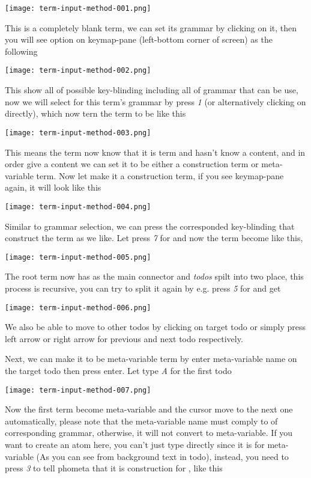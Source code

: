 \documentclass[master.tex]{subfiles}
\begin{document}
\centerline{\texttt{[image: term-input-method-001.png]}}

This is a completely blank term, we can set its grammar by clicking on it, then
you will see option on keymap-pane (left-bottom corner of screen) as the following

\centerline{\texttt{[image: term-input-method-002.png]}}

This show all of possible key-blinding including all of grammar that can be use,
now we will select  for this term's grammar by press \emph{1}
(or alternatively clicking on  directly), which now tern the
term to be like this

\centerline{\texttt{[image: term-input-method-003.png]}}

This means the term now know that it is  term and hasn't know a
content, and in order give a content we can set it to be either a construction
term or meta-variable term. Now let make it a construction term, if you see
keymap-pane again, it will look like this

\centerline{\texttt{[image: term-input-method-004.png]}}

Similar to grammar selection, we can press the corresponded key-blinding that
construct the term as we like. Let press \emph{7} for  and now the term become like this,

\centerline{\texttt{[image: term-input-method-005.png]}}

The root term now has \pifmt{$\rightarrow$} as the main connector and
\emph{todos} spilt into two place, this process is recursive, you can try to
split it again by e.g. press \emph{5} for  and get

\centerline{\texttt{[image: term-input-method-006.png]}}

We also be able to move to other todos by clicking on target todo or simply
press left arrow or right arrow for previous and next todo respectively.

Next, we can make it to be meta-variable term by enter meta-variable name on the
target todo then press enter. Let type \emph{A} for the first todo

\centerline{\texttt{[image: term-input-method-007.png]}}

Now the first term become meta-variable and the cursor move to the next one
automatically, please note that the meta-variable name must comply to \kVarRegex
of corresponding grammar, otherwise, it will not convert to meta-variable. If
you want to create an atom here, you can't just type directly since it is for
 meta-variable (As you can see from background text in todo),
instead, you need to press \emph{3} to tell phometa that it is construction for
, like this
\end{document}
